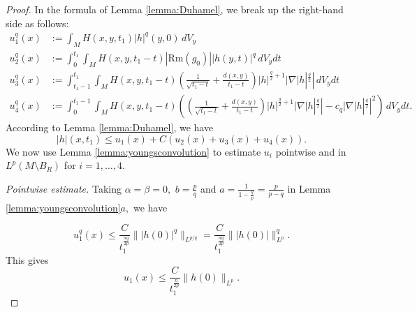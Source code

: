 \documentclass[12pt]{amsart}
\renewcommand{\1}{{\mathbf 1}}
\newcommand{\Rm}{\mathrm{Rm}}
\newtheorem{lemma}[thm]{Lemma}
\theoremstyle{others}
\numberwithin{equation}{section}
\begin{document}
\begin{proof} 

In the formula of Lemma \ref{lemma:Duhamel}, we break up the right-hand side as follows:
\begin{equation}\label{Lpbootstrap:RHSsplitting}
    \begin{split}
        u_1^q(x) & := \int_M H(x,y,t_1) |h|^q(y,0) \, dV_y \\
        u_2^q(x) & := \int_0^{t_1} \!\!\!\! \int_M H(x,y,t_1 - t) |\Rm(g_0)| |h(y,t)|^q \, dV_y dt \\
        u_3^q(x) & := \int_{t_1 - 1}^{t_1} \!\! \int_M H(x,y,t_1 - t) \left( \frac{1}{\sqrt{t_1 - t}} + \frac{d(x,y)}{t_1-t} \right) |h|^{\frac{q}{2} + 1} |\nabla |h|^{\frac{q}{2}} | \, dV_y dt \\
        u_4^q(x) & := \int_0^{t_1 - 1} \!\!\!\! \int_M H(x,y,t_1 - t) \left( \left( \frac{1}{\sqrt{t_1 - t}} + \frac{d(x,y)}{t_1 - t} \right) |h|^{\frac{q}{2} + 1} |\nabla |h|^{\frac{q}{2}} | - c_q |\nabla |h|^{\frac{q}{2}} |^2 \right) \, dV_y dt.
    \end{split}
\end{equation}
According to Lemma \ref{lemma:Duhamel}, we have
\begin{equation}\label{hlessthanu1tou4}
    |h|(x,t_1) \leq u_1(x) + C \left( u_2(x) + u_3(x) + u_4(x) \right).
    \end{equation}
    We now use Lemma \ref{lemma:youngsconvolution} to estimate $u_i$ pointwise and in $L^{p}(M \setminus B_R)$ for $i = 1, \ldots, 4.$ 
       

       \vspace{2mm}
       
        \emph{Pointwise estimate.} Taking $\alpha = \beta = 0,$ $b = \frac{p}{q}$ and $a = \frac{1}{1 - \frac{q}{p}} = \frac{p}{p - q}$ in Lemma \ref{lemma:youngsconvolution}$a,$ we have

       $$u^q_1(x) \leq \frac{C}{t_1^{\frac{nq}{2p}}} \||h(0)|^q\|_{L^{p/q}} = \frac{C}{t_1^{\frac{nq}{2p}}} \||h(0)|\|^q_{L^{p}}.$$
       This gives
       \begin{equation}\label{u1xest}
          u_1(x) \leq \frac{C}{t_1^{\frac{n}{2p}}} \|h(0)\|_{L^{p}}.
          \end{equation}
          

\end{proof}
\end{document}
